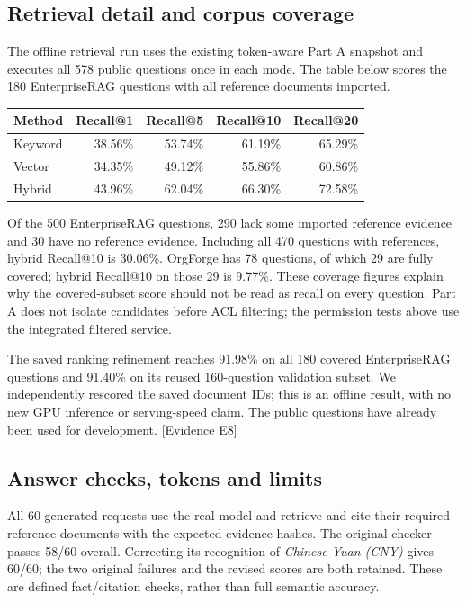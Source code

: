 \documentclass[10pt,a4paper]{article}
\newcommand{\evidence}[1]{{\footnotesize\textcolor{Muted}{[Evidence #1]}}}
\begin{document}
\subsection{Retrieval detail and corpus coverage}
The offline retrieval run uses the existing token-aware Part A snapshot and executes all 578 public questions once in each mode. The table below scores the 180 EnterpriseRAG questions with all reference documents imported.

\begin{center}
\small
\begin{tabular}{@{}lrrrr@{}}
\toprule
\textbf{Method} & \textbf{Recall@1} & \textbf{Recall@5} & \textbf{Recall@10} & \textbf{Recall@20} \\
\midrule
Keyword & 38.56\% & 53.74\% & 61.19\% & 65.29\% \\
Vector & 34.35\% & 49.12\% & 55.86\% & 60.86\% \\
Hybrid & 43.96\% & 62.04\% & 66.30\% & 72.58\% \\
\bottomrule
\end{tabular}
\end{center}

Of the 500 EnterpriseRAG questions, 290 lack some imported reference evidence and 30 have no reference evidence. Including all 470 questions with references, hybrid Recall@10 is 30.06\%. OrgForge has 78 questions, of which 29 are fully covered; hybrid Recall@10 on those 29 is 9.77\%. These coverage figures explain why the covered-subset score should not be read as recall on every question. Part A does not isolate candidates before ACL filtering; the permission tests above use the integrated filtered service.

The saved ranking refinement reaches 91.98\% on all 180 covered EnterpriseRAG questions and 91.40\% on its reused 160-question validation subset. We independently rescored the saved document IDs; this is an offline result, with no new GPU inference or serving-speed claim. The public questions have already been used for development. \evidence{E8}

\subsection{Answer checks, tokens and limits}
All 60 generated requests use the real model and retrieve and cite their required reference documents with the expected evidence hashes. The original checker passes 58/60 overall. Correcting its recognition of \emph{Chinese Yuan (CNY)} gives 60/60; the two original failures and the revised scores are both retained. These are defined fact/citation checks, rather than full semantic accuracy.
\end{document}
